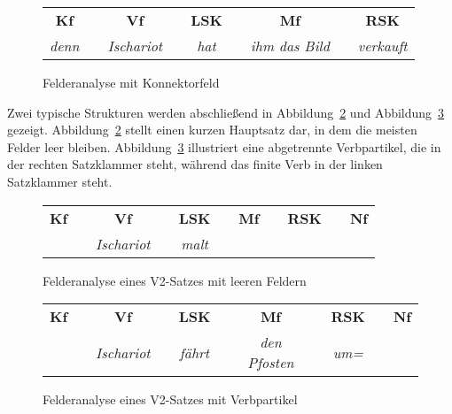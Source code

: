 \begin{figure}
  \centering
  \begin{tabular}{cp{0.1em}cp{0.1em}cp{0.1em}cp{0.1em}c}
    \textbf{Kf} && \textbf{Vf} && \textbf{LSK} && \textbf{Mf} && \textbf{RSK} \\
    \cmidrule{1-1}\cmidrule{3-3}\cmidrule{5-5}\cmidrule{7-7}\cmidrule{9-9}
    \textit{denn} && \textit{Ischariot} && \textit{hat} && \textit{ihm das Bild} && \textit{verkauft} \\
  \end{tabular}
  \caption{Felderanalyse mit Konnektorfeld}
  \label{fig:konnektorfeld}
\end{figure}

Zwei typische Strukturen werden abschließend in Abbildung~\ref{fig:leerefelder} und Abbildung~\ref{fig:verbpartikelalleinzuhaus} gezeigt.
Abbildung~\ref{fig:leerefelder} stellt einen kurzen Hauptsatz dar, in dem die meisten Felder leer bleiben.
Abbildung~\ref{fig:verbpartikelalleinzuhaus} illustriert eine abgetrennte Verbpartikel, die in der rechten Satzklammer steht, während das finite Verb in der linken Satzklammer steht.

\begin{figure}
  \centering
  \begin{tabular}{cp{0.1em}cp{0.1em}cp{0.1em}cp{0.1em}cp{0.1em}c}
    \textbf{Kf} && \textbf{Vf} && \textbf{LSK} && \textbf{Mf} && \textbf{RSK} && \textbf{Nf} \\
    \cmidrule{1-1}\cmidrule{3-3}\cmidrule{5-5}\cmidrule{7-7}\cmidrule{9-9}
    && \textit{Ischariot} && \textit{malt} &&&&&& \\
  \end{tabular}
  \caption{Felderanalyse eines V2-Satzes mit leeren Feldern}
  \label{fig:leerefelder}
\end{figure}

\begin{figure}
  \centering
  \begin{tabular}{cp{0.1em}cp{0.1em}cp{0.1em}cp{0.1em}cp{0.1em}c}
    \textbf{Kf} && \textbf{Vf} && \textbf{LSK} && \textbf{Mf} && \textbf{RSK} && \textbf{Nf} \\
    \cmidrule{1-1}\cmidrule{3-3}\cmidrule{5-5}\cmidrule{7-7}\cmidrule{9-9}\cmidrule{11-11}
    && \textit{Ischariot} && \textit{fährt} && \textit{den Pfosten} && \textit{um=} & \\
  \end{tabular}
  \caption{Felderanalyse eines V2-Satzes mit Verbpartikel}
  \label{fig:verbpartikelalleinzuhaus}
\end{figure}


